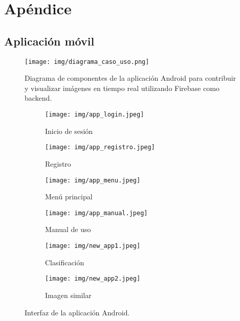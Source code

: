\documentclass[10pt,a4paper,twocolumn,twoside]{article}
\begin{document}
\onecolumn

\appendix

\section*{Apéndice}

\setcounter{section}{1}

\subsection{Aplicación móvil}

\begin{figure}[h]
  \centering
  \texttt{[image: img/diagrama\_caso\_uso.png]}
  \caption{Diagrama de componentes de la aplicación Android para contribuir y visualizar imágenes en tiempo real utilizando Firebase como backend.}
  \label{fig:diagrama_caso_uso}
\end{figure}

\begin{figure}[h]
  \centering
  \begin{subfigure}[b]{0.16\textwidth}
    \texttt{[image: img/app\_login.jpeg]}
    \caption{Inicio de sesión}
    \label{fig:imagen1}
  \end{subfigure}
  \begin{subfigure}[b]{0.16\textwidth}
    \texttt{[image: img/app\_registro.jpeg]}
    \caption{Registro}
    \label{fig:imagen2}
  \end{subfigure}
  \begin{subfigure}[b]{0.16\textwidth}
    \texttt{[image: img/app\_menu.jpeg]}
    \caption{Menú principal}
    \label{fig:imagen3}
  \end{subfigure}
  \begin{subfigure}[b]{0.16\textwidth}
    \texttt{[image: img/app\_manual.jpeg]}
    \caption{Manual de uso}
    \label{fig:imagen4}
  \end{subfigure}
  \begin{subfigure}[b]{0.16\textwidth}
    \texttt{[image: img/new\_app1.jpeg]}
    \caption{Clasificación}
    \label{fig:imagen5}
  \end{subfigure}
  \begin{subfigure}[b]{0.16\textwidth}
    \texttt{[image: img/new\_app2.jpeg]}
    \caption{Imagen similar}
    \label{fig:imagen6}
  \end{subfigure}
  \caption{Interfaz de la aplicación Android.}
  \label{fig:seis_imagenes}
\end{figure}
\end{document}
